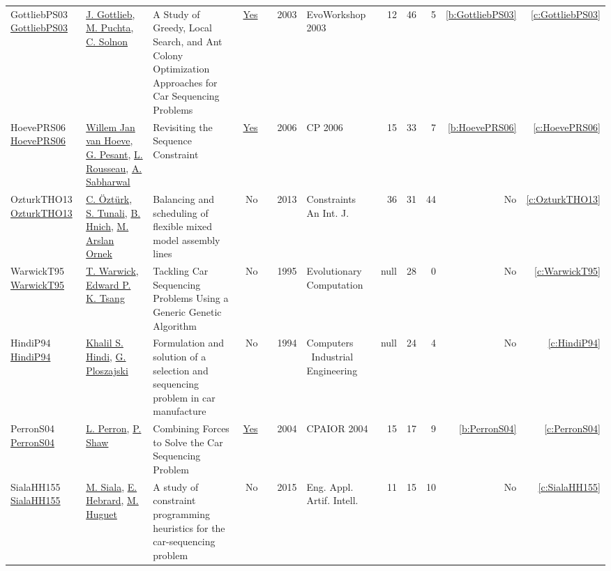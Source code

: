 {\begin{longtable}{>{\raggedright\arraybackslash}p{3cm}>{\raggedright\arraybackslash}p{6cm}>{\raggedright\arraybackslash}p{6.5cm}rrrp{2.5cm}rrrrr}
GottliebPS03 \href{https://doi.org/10.1007/3-540-36605-9_23}{GottliebPS03} & \hyperref[auth:a9]{J. Gottlieb}, \hyperref[auth:a10]{M. Puchta}, \hyperref[auth:a5]{C. Solnon} & A Study of Greedy, Local Search, and Ant Colony Optimization Approaches for Car Sequencing Problems & \href{cars/works/GottliebPS03.pdf}{Yes} & \cite{GottliebPS03} & 2003 & EvoWorkshop 2003 & 12 & 46 & 5 & \ref{b:GottliebPS03} & \ref{c:GottliebPS03}\\
HoevePRS06 \href{https://doi.org/10.1007/11889205\_44}{HoevePRS06} & \hyperref[auth:a43]{Willem Jan van Hoeve}, \hyperref[auth:a40]{G. Pesant}, \hyperref[auth:a44]{L. Rousseau}, \hyperref[auth:a42]{A. Sabharwal} & Revisiting the Sequence Constraint & \href{cars/works/HoevePRS06.pdf}{Yes} & \cite{HoevePRS06} & 2006 & CP 2006 & 15 & 33 & 7 & \ref{b:HoevePRS06} & \ref{c:HoevePRS06}\\
OzturkTHO13 \href{https://doi.org/10.1007/s10601-013-9142-6}{OzturkTHO13} & \hyperref[auth:a14]{C. {\"{O}}zt{\"{u}}rk}, \hyperref[auth:a15]{S. Tunali}, \hyperref[auth:a16]{B. Hnich}, \hyperref[auth:a17]{M. Arslan Ornek} & Balancing and scheduling of flexible mixed model assembly lines & No & \cite{OzturkTHO13} & 2013 & Constraints An Int. J. & 36 & 31 & 44 & No & \ref{c:OzturkTHO13}\\
WarwickT95 \href{http://dx.doi.org/10.1162/evco.1995.3.3.267}{WarwickT95} & \hyperref[auth:a45]{T. Warwick}, \hyperref[auth:a46]{Edward P. K. Tsang} & Tackling Car Sequencing Problems Using a Generic Genetic Algorithm & No & \cite{WarwickT95} & 1995 & Evolutionary Computation & null & 28 & 0 & No & \ref{c:WarwickT95}\\
HindiP94 \href{http://dx.doi.org/10.1016/0360-8352(94)90038-8}{HindiP94} & \hyperref[auth:a37]{Khalil S. Hindi}, \hyperref[auth:a38]{G. Ploszajski} & Formulation and solution of a selection and sequencing problem in car manufacture & No & \cite{HindiP94} & 1994 & Computers \  Industrial Engineering & null & 24 & 4 & No & \ref{c:HindiP94}\\
PerronS04 \href{https://doi.org/10.1007/978-3-540-24664-0_16}{PerronS04} & \hyperref[auth:a20]{L. Perron}, \hyperref[auth:a21]{P. Shaw} & Combining Forces to Solve the Car Sequencing Problem & \href{cars/works/PerronS04.pdf}{Yes} & \cite{PerronS04} & 2004 & CPAIOR 2004 & 15 & 17 & 9 & \ref{b:PerronS04} & \ref{c:PerronS04}\\
SialaHH155 \href{https://doi.org/10.1016/j.engappai.2014.10.009}{SialaHH155} & \hyperref[auth:a11]{M. Siala}, \hyperref[auth:a12]{E. Hebrard}, \hyperref[auth:a13]{M. Huguet} & A study of constraint programming heuristics for the car-sequencing problem & No & \cite{SialaHH155} & 2015 & Eng. Appl. Artif. Intell. & 11 & 15 & 10 & No & \ref{c:SialaHH155}\\

\end{longtable}}
